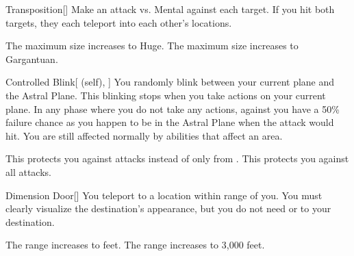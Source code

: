 \lowercase{\hypertarget{spell:Transposition}{}}\label{spell:Transposition}
\begin{freeability}[Rank 3]{\hypertarget{spell:Transposition}{Transposition}}[]
Make an attack vs. Mental against each target.
If you hit both targets, they each teleport into each other's locations.

\rankline
{} The maximum size increases to Huge.
 The maximum size increases to Gargantuan.
\end{freeability}
\vspace{0.25em}



\lowercase{\hypertarget{spell:Controlled Blink}{}}\label{spell:Controlled Blink}
\begin{attuneability}[Rank 4]{\hypertarget{spell:Controlled Blink}{Controlled Blink}}[ (self), ]
You randomly blink between your current plane and the Astral Plane.
This blinking stops when you take actions on your current plane.
In any phase where you do not take any actions,   against you have a 50\% failure chance as you happen to be in the Astral Plane when the attack would hit.
You are still affected normally by abilities that affect an area.

\rankline
{} This protects you against   attacks instead of only from .
 This protects you against all  attacks.
\end{attuneability}
\vspace{0.25em}



\lowercase{\hypertarget{spell:Dimension Door}{}}\label{spell:Dimension Door}
\begin{freeability}[Rank 4]{\hypertarget{spell:Dimension Door}{Dimension Door}}[]
You teleport to a location within \rnglong range of you.
You must clearly visualize the destination's appearance, but you do not need  or  to your destination.

\rankline
{} The range increases to \rngext feet.
 The range increases to 3,000 feet.
\end{freeability}
\vspace{0.25em}




